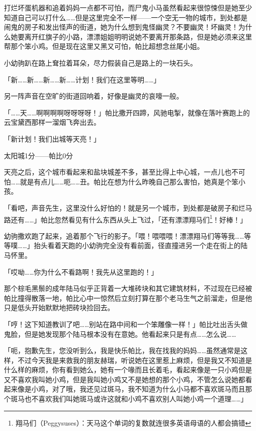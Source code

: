 打烂坏蛋机器和追着妈妈一点都不可怕，而尸鬼小马虽然看起来很惊悚但是她至少知道自己可以打什么……但是这里完全不一样——一个空无一物的城市，到处都是闹鬼的房子和发出怪声的街道，她为什么想到鬼怪幽灵？不要幽灵！坏幽灵！为什么她要离开红旗子的小路，漂漂姐姐明明说她不要离开那条路，但是她必须来这里帮那个笨小鸡。但是现在这里又黑又可怕，帕比超想念丝尾小姐。

小幼驹趴在路上耷拉着耳朵，尽力假装自己是路上的一块石头。

「新……新……新……新……计划！我们在这里等明……」

另一阵声音在空旷的街道回响着，好像是幽灵的哀嚎一般。

「……天……啊啊啊啊呀呀呀呀！」帕比撒开四蹄，风驰电掣，就像在落叶赛跑上的云宝黛西那样一溜烟飞奔出去。

「新计划！我们出城等天亮！」

\begin{center}
太阳城1分——帕比0分
\end{center}

\horizonline


天亮之后，这个城市看起来和盐块城差不多，甚至比得上中心城，一点儿也不可怕……就是有点儿……呃……丑。帕比在想为什么昨晚自己那么害怕，她真是个笨小孩。

「看吧，声音先生，这里没什么好怕的！就是另一个城市，到处都是破房子和烂马路还有……」帕比忽然看见有什么东西从头上飞过，「还有漂漂翔马们\footnote{翔马们（Peggysuses）：天马这个单词的复数就连很多英语母语的人都会搞错}！好棒！」

幼驹撒欢跑了起来，追着那个飞行的影子。「喂！喂喂喂！漂漂翔马们等等我……等等噗……」抬头看着天跑的小幼驹完全没有看前面，径直撞进另一个走在街上的陆马怀里。

「哎呦……你为什么不看路啊！我先从这里跑的！」

那个棕毛黑鬃的成年陆马似乎正背着一大堆砖块和其它建筑材料，不过现在已经被帕比撞得散落一地，帕比心中一惊然后立刻打算在那个老马生气之前溜走，但是他只是低头开始默默地把砖块捡回去。

「哼！这下知道教训了吧……别站在路中间和一个笨雕像一样！」帕比吐出舌头做鬼脸，但是她发现那个陆马根本没有在意她。他看起来只是有点……怎么说……

「呃，抱歉先生，您没听到么，我是快乐帕比，我在找我的妈妈……虽然通常是这样，不过今天我是来救我的朋友赫瑞，听说她在这里惹上麻烦，但是我又不知道是什么样的麻烦，你有看到她么，她有一个喙而且长着毛，看起来像是一只小鸡但是又不喜欢我叫她小鸡，但是我叫她小鸡又不是她想的那个小鸡，不管怎么说她都看起来像是小鸡，对了哦，我还见过斑马，我不知道为什么小马都不喜欢斑马而且那个斑马也不喜欢我们叫她斑马或许这就和小鸡不喜欢别人叫她小鸡一个道理……」

